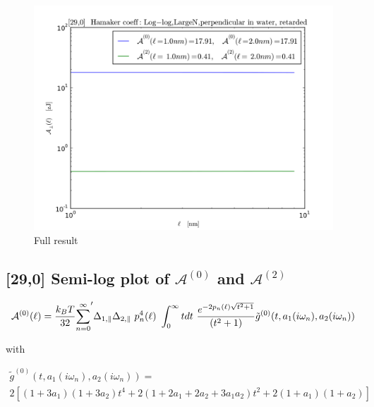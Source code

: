 \documentclass[a4paper]{article}
\begin{document}
\begin{center}
\begin{figure}[t!]
\begin{center}
\includegraphics[width=1.2\textwidth]{large_N/140322_290w290_HCs_perpendicular_ret_lrg_n.png}
\hskip 43pt
\caption{Full result}
\label{eiz65}
\end{center}
\end{figure} 

\subsection{[29,0] Semi-log plot of $\mathcal{A}^{(0)}$ and $\mathcal{A}^{(2)}$ }
\begin{equation}
{\cal A}^{(0)}(\ell) = \frac{k_BT}{32}  {\sum_{n=0}^{\infty}}' \Delta_{1,\parallel} \Delta_{2,\parallel} ~p_n^{4}(\ell) ~\int_0^{\infty} t dt ~\frac{e^{- 2 p_n(\ell) \sqrt{t^{2} + 1}}}{(t^{2} + 1)} \tilde g^{(0)}(t, a_1(i \omega_n), a_2(i \omega_n))
\end{equation}

with

\begin{multline*}
\tilde g^{(0)}(t, a_1(i \omega_n), a_2(i \omega_n)) = \\ 
2 \left[ (1+3a_1)(1+3a_2) t^{4} + 2 (1+2a_1+2a_2+3a_1a_2) t^{2}  + 2(1+a_1)(1+a_2)\right]
\end{multline*}


\end{center}
\end{document}
